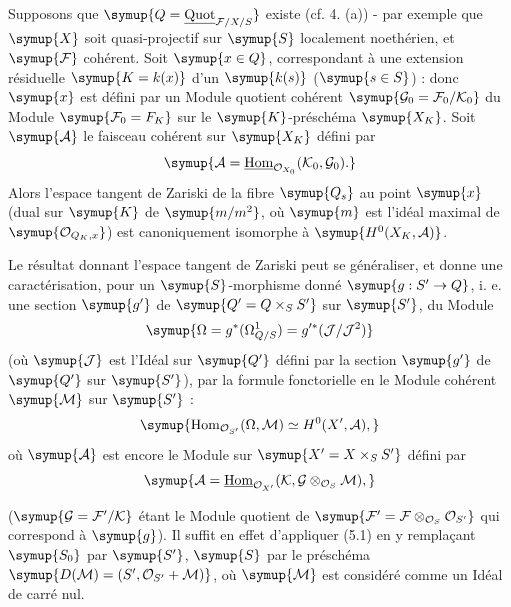  Supposons que
$\symup{Q=\underline{\operatorname{Quot}}_{\mathcal F/X/S}}$ existe (cf. 4. (a)) - par exemple que
$\symup{X}$ soit quasi-projectif sur $\symup{S}$ localement noethérien, et $\symup{\mathcal F}$
cohérent. Soit $\symup{x\in Q}$, correspondant à une extension résiduelle $\symup{K=k(x)}$
d'un $\symup{k(s)}$ ($\symup{s\in S}$) :
donc $\symup{x}$ est défini par un Module quotient cohérent
$\symup{\mathcal G_0=\mathcal F_0/\mathcal K_0}$ du Module
$\symup{\mathcal F_0=F_K}$ sur le $\symup{K}$-préschéma $\symup{X_K}$. Soit $\symup{\mathcal A}$ le
faisceau cohérent sur $\symup{X_K}$ défini par
\[
\symup{\mathcal A=\underline{\operatorname{Hom}}_{\mathcal O_{X_0}}(\mathcal K_0,\mathcal G_0).}
\]
Alors l'espace tangent de Zariski de la fibre $\symup{Q_s}$ au point $\symup{x}$ (dual sur $\symup{K}$
de $\symup{m/m^2}$, où $\symup{m}$ est l'idéal maximal de
$\symup{\mathcal O_{Q_K,x}}$) est canoniquement isomorphe à $\symup{H^0(X_K,\mathcal A)}$.

Le résultat donnant l'espace tangent de Zariski peut se généraliser, et donne
une caractérisation, pour un $\symup{S}$-morphisme donné $\symup{g:S'\to Q}$, i. e.
une section $\symup{g'}$ de $\symup{Q'=Q\times_SS'}$ sur $\symup{S'}$, du Module
\[
\symup{\Omega=g^*(\Omega^1_{Q/S})=g'^*(\mathcal J/\mathcal J^2)}
\]
(où $\symup{\mathcal J}$ est l'Idéal sur $\symup{Q'}$ défini par la section $\symup{g'}$ de $\symup{Q'}$ sur
$\symup{S'}$), par la formule fonctorielle en le Module cohérent $\symup{\mathcal M}$ sur $\symup{S'}$ :
\[
\symup{\operatorname{Hom}_{\mathcal O_{S'}}(\Omega,\mathcal M)
\simeq H^0(X',\mathcal A),}
\]
où $\symup{\mathcal A}$ est encore le Module sur $\symup{X'=X\times_SS'}$ défini par
\[
\symup{\mathcal A=\underline{\operatorname{Hom}}_{\mathcal O_{X'}}
(\mathcal K,\mathcal G\otimes_{\mathcal O_S}\mathcal M),}
\]

($\symup{\mathcal G=\mathcal F'/\mathcal K}$ étant le Module quotient de
$\symup{\mathcal F'=\mathcal F\otimes_{\mathcal O_S}\mathcal O_{S'}}$ qui correspond à
$\symup{g}$). Il suffit en effet d'appliquer (5.1) en y remplaçant $\symup{S_0}$ par $\symup{S'}$, $\symup{S}$
par le préschéma $\symup{D(\mathcal M)=(S',\mathcal O_{S'}+\mathcal M)}$, où
$\symup{\mathcal M}$ est considéré comme un Idéal de carré nul.

